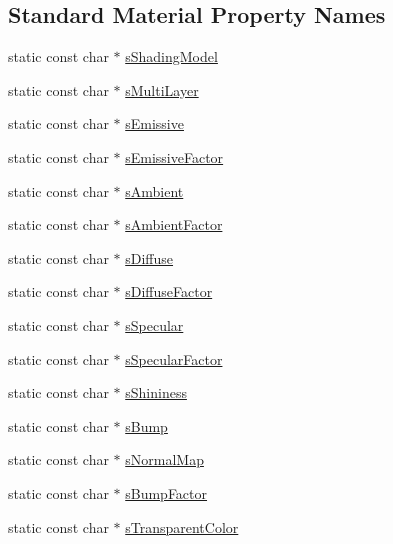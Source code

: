 \subsection*{Standard Material Property Names}
\begin{DoxyCompactItemize}
\item 
static const char $\ast$ \hyperlink{class_fbx_surface_material_a19cda45ce40caee3f3362df386ed85ed}{s\+Shading\+Model}
\item 
static const char $\ast$ \hyperlink{class_fbx_surface_material_a2443f776dd14ffb9b114aa55d653058d}{s\+Multi\+Layer}
\item 
static const char $\ast$ \hyperlink{class_fbx_surface_material_a28d09e2e3a188eb5924c2dd2b4963441}{s\+Emissive}
\item 
static const char $\ast$ \hyperlink{class_fbx_surface_material_a6a8ba50813f5454b09a0f86dc0018cb4}{s\+Emissive\+Factor}
\item 
static const char $\ast$ \hyperlink{class_fbx_surface_material_a11ec0ad2211cea761901fbc418f4c713}{s\+Ambient}
\item 
static const char $\ast$ \hyperlink{class_fbx_surface_material_ac9daa48c32c82476002a2e003f6a8787}{s\+Ambient\+Factor}
\item 
static const char $\ast$ \hyperlink{class_fbx_surface_material_adfa9bf8213a75174fd191889779e436e}{s\+Diffuse}
\item 
static const char $\ast$ \hyperlink{class_fbx_surface_material_a6087923541801b9f173c5fc896bc928a}{s\+Diffuse\+Factor}
\item 
static const char $\ast$ \hyperlink{class_fbx_surface_material_a8ed16896904dfc813ce3dfb17addfe31}{s\+Specular}
\item 
static const char $\ast$ \hyperlink{class_fbx_surface_material_a8f674dd71c227e6265bd0f4175545390}{s\+Specular\+Factor}
\item 
static const char $\ast$ \hyperlink{class_fbx_surface_material_ab52a948503c98b4483a26d72733f06c8}{s\+Shininess}
\item 
static const char $\ast$ \hyperlink{class_fbx_surface_material_aee6c90fb1f0aedba61cb3ad0b0a4c0c5}{s\+Bump}
\item 
static const char $\ast$ \hyperlink{class_fbx_surface_material_add1de4795018419a9611051d778c9d4d}{s\+Normal\+Map}
\item 
static const char $\ast$ \hyperlink{class_fbx_surface_material_a96c5d9038e9916ea09744d8bcba2a570}{s\+Bump\+Factor}
\item 
static const char $\ast$ \hyperlink{class_fbx_surface_material_a0c0458dc370a65c283364bd6aba8a33b}{s\+Transparent\+Color}

\end{DoxyCompactItemize}
